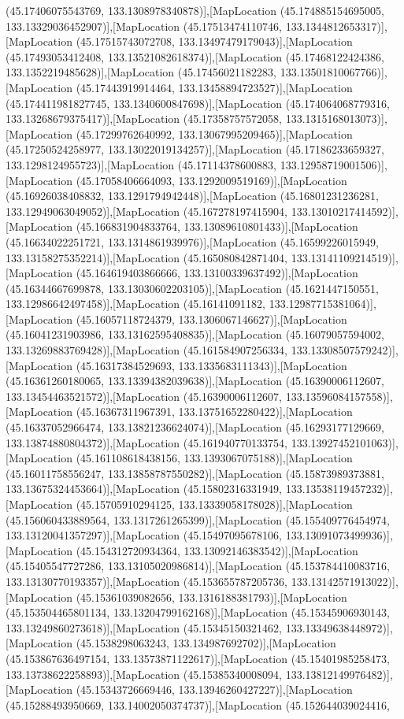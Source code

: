 (45.17406075543769, 133.1308978340878)],[MapLocation (45.174885154695005, 133.13329036452907)],[MapLocation (45.17513474110746, 133.1344812653317)],[MapLocation (45.17515743072708, 133.13497479179043)],[MapLocation (45.17493053412408, 133.13521082618374)],[MapLocation (45.17468122424386, 133.1352219485628)],[MapLocation (45.17456021182283, 133.13501810067766)],[MapLocation (45.17443919914464, 133.13458894723527)],[MapLocation (45.174411981827745, 133.1340600847698)],[MapLocation (45.174064068779316, 133.13268679375417)],[MapLocation (45.17358757572058, 133.1315168013073)],[MapLocation (45.17299762640992, 133.13067995209465)],[MapLocation (45.17250524258977, 133.13022019134257)],[MapLocation (45.17186233659327, 133.1298124955723)],[MapLocation (45.17114378600883, 133.12958719001506)],[MapLocation (45.17058406664093, 133.1292009519169)],[MapLocation (45.16926038408832, 133.1291794942448)],[MapLocation (45.16801231236281, 133.12949063049052)],[MapLocation (45.167278197415904, 133.13010217414592)],[MapLocation (45.166831904833764, 133.13089610801433)],[MapLocation (45.16634022251721, 133.1314861939976)],[MapLocation (45.16599226015949, 133.13158275352214)],[MapLocation (45.165080842871404, 133.13141109214519)],[MapLocation (45.164619403866666, 133.13100339637492)],[MapLocation (45.16344667699878, 133.13030602203105)],[MapLocation (45.1621447150551, 133.12986642497458)],[MapLocation (45.16141091182, 133.12987715381064)],[MapLocation (45.16057118724379, 133.1306067146627)],[MapLocation (45.16041231903986, 133.13162595408835)],[MapLocation (45.16079057594002, 133.13269883769428)],[MapLocation (45.161584907256334, 133.13308507579242)],[MapLocation (45.16317384529693, 133.1335683111343)],[MapLocation (45.16361260180065, 133.13394382039638)],[MapLocation (45.16390006112607, 133.13454463521572)],[MapLocation (45.16390006112607, 133.13596084157558)],[MapLocation (45.16367311967391, 133.13751652280422)],[MapLocation (45.16337052966474, 133.13821236624074)],[MapLocation (45.16293177129669, 133.13874880804372)],[MapLocation (45.161940770133754, 133.13927452101063)],[MapLocation (45.161108618438156, 133.1393067075188)],[MapLocation (45.16011758556247, 133.13858787550282)],[MapLocation (45.15873989373881, 133.13675324453664)],[MapLocation (45.15802316331949, 133.13538119457232)],[MapLocation (45.15705910294125, 133.13339058178028)],[MapLocation (45.156060433889564, 133.1317261265399)],[MapLocation (45.155409776454974, 133.13120041357297)],[MapLocation (45.15497095678106, 133.13091073499936)],[MapLocation (45.154312720934364, 133.13092146383542)],[MapLocation (45.15405547727286, 133.13105020986814)],[MapLocation (45.153784410083716, 133.13130770193357)],[MapLocation (45.153655787205736, 133.13142571913022)],[MapLocation (45.15361039082656, 133.1316188381793)],[MapLocation (45.153504465801134, 133.13204799162168)],[MapLocation (45.15345906930143, 133.13249860273618)],[MapLocation (45.15345150321462, 133.13349638448972)],[MapLocation (45.1538298063243, 133.134987692702)],[MapLocation (45.153867636497154, 133.13573871122617)],[MapLocation (45.15401985258473, 133.13738622258893)],[MapLocation (45.15385340008094, 133.13812149976482)],[MapLocation (45.15343726669446, 133.13946260427227)],[MapLocation (45.15288493950669, 133.14002050374737)],[MapLocation (45.152644039024416, 